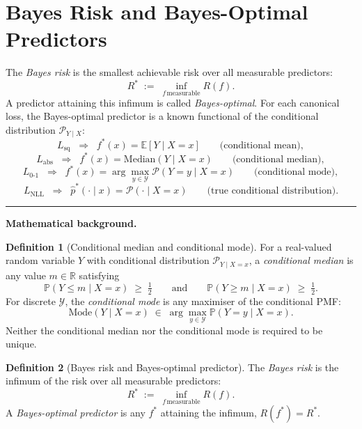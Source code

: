 \documentclass[11pt]{article}
\theoremstyle{definition}
\newtheorem{definition}{Definition}
\begin{document}
\section{Bayes Risk and Bayes-Optimal Predictors}

The \emph{Bayes risk} is the smallest achievable risk over all measurable
predictors:
\[
  R^{\ast} \;:=\; \inf_{f \,\text{measurable}} R(f).
\]
A predictor attaining this infimum is called \emph{Bayes-optimal}. For each
canonical loss, the Bayes-optimal predictor is a known functional of the
conditional distribution $\mathcal{P}_{Y \mid X}$:
\[
  L_{\mathrm{sq}} \;\;\Longrightarrow\;\;
  f^{\ast}(x) = \mathbb{E}[Y \mid X = x]
  \qquad \text{(conditional mean)},
\]
\[
  L_{\mathrm{abs}} \;\;\Longrightarrow\;\;
  f^{\ast}(x) = \mathrm{Median}(Y \mid X = x)
  \qquad \text{(conditional median)},
\]
\[
  L_{0\text{-}1} \;\;\Longrightarrow\;\;
  f^{\ast}(x) = \arg\max_{y \in \mathcal{Y}} \mathcal{P}(Y = y \mid X = x)
  \qquad \text{(conditional mode)},
\]
\[
  L_{\mathrm{NLL}} \;\;\Longrightarrow\;\;
  \hat p^{\ast}(\cdot \mid x) = \mathcal{P}(\cdot \mid X = x)
  \qquad \text{(true conditional distribution)}.
\]

\bigskip
\hrule
\bigskip

\noindent\textbf{Mathematical background.}

\begin{definition}[Conditional median and conditional mode]
For a real-valued random variable $Y$ with conditional distribution
$\mathcal{P}_{Y \mid X = x}$, a \emph{conditional median} is any value
$m \in \mathbb{R}$ satisfying
\[
  \mathbb{P}(Y \leq m \mid X = x) \;\geq\; \tfrac{1}{2}
  \qquad \text{and} \qquad
  \mathbb{P}(Y \geq m \mid X = x) \;\geq\; \tfrac{1}{2}.
\]
For discrete $\mathcal{Y}$, the \emph{conditional mode} is any maximiser of
the conditional PMF:
\[
  \mathrm{Mode}(Y \mid X = x) \;\in\; \arg\max_{y \in \mathcal{Y}}
  \mathbb{P}(Y = y \mid X = x).
\]
Neither the conditional median nor the conditional mode is required to be
unique.
\end{definition}

\begin{definition}[Bayes risk and Bayes-optimal predictor]
The \emph{Bayes risk} is the infimum of the risk over all measurable
predictors:
\[
  R^{\ast} \;:=\; \inf_{f \,\text{measurable}} R(f).
\]
A \emph{Bayes-optimal predictor} is any $f^{\ast}$ attaining the infimum,
$R(f^{\ast}) = R^{\ast}$.
\end{definition}
\end{document}
